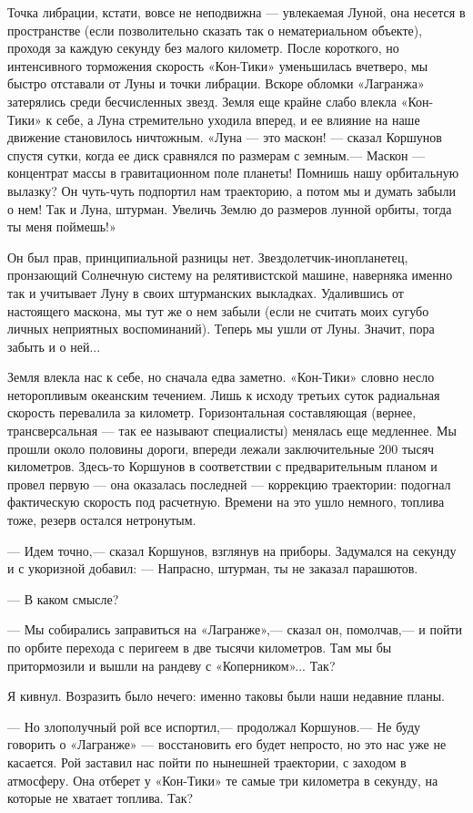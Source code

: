 \documentclass[11pt,a4paper,oneside]{article}
\begin{document}
Точка либрации, кстати, вовсе не неподвижна — увлекаемая Луной, она несется в пространстве (если позволительно сказать так о нематериальном объекте), проходя за каждую секунду без малого километр. После короткого, но интенсивного торможения скорость «Кон-Тики» уменьшилась вчетверо, мы быстро отставали от Луны и точки либрации. Вскоре обломки «Лагранжа» затерялись среди бесчисленных звезд. Земля еще крайне слабо влекла «Кон- Тики» к себе, а Луна стремительно уходила вперед, и ее влияние на наше движение становилось ничтожным. «Луна — это маскон! — сказал Коршунов спустя сутки, когда ее диск сравнялся по размерам с земным.— Маскон — концентрат массы в гравитационном поле планеты! Помнишь нашу орбитальную вылазку? Он чуть-чуть подпортил нам траекторию, а потом мы и думать забыли о нем! Так и Луна, штурман. Увеличь Землю до размеров лунной орбиты, тогда ты меня поймешь!»

Он был прав, принципиальной разницы нет. Звездолетчик-инопланетец, пронзающий Солнечную систему на релятивистской машине, наверняка именно так и учитывает Луну в своих штурманских выкладках. Удалившись от настоящего маскона, мы тут же о нем забыли (если не считать моих сугубо личных неприятных воспоминаний). Теперь мы ушли от Луны. Значит, пора забыть и о ней...

Земля влекла нас к себе, но сначала едва заметно. «Кон-Тики» словно несло неторопливым океанским течением. Лишь к исходу третьих суток радиальная скорость перевалила за километр. Горизонтальная составляющая (вернее, трансверсальная — так ее называют специалисты) менялась еще медленнее. Мы прошли около половины дороги, впереди лежали заключительные 200 тысяч километров. Здесь-то Коршунов в соответствии с предварительным планом и провел первую — она оказалась последней — коррекцию траектории: подогнал фактическую скорость под расчетную. Времени на это ушло немного, топлива тоже, резерв остался нетронутым.

— Идем точно,— сказал Коршунов, взглянув на приборы. Задумался на секунду и с укоризной добавил: — Напрасно, штурман, ты не заказал парашютов.

— В каком смысле?

— Мы собирались заправиться на «Лагранже»,— сказал он, помолчав,— и пойти по орбите перехода с перигеем в две тысячи километров. Там мы бы притормозили и вышли на рандеву с «Коперником»... Так?

Я кивнул. Возразить было нечего: именно таковы были наши недавние планы.

— Но злополучный рой все испортил,— продолжал Коршунов.— Не буду говорить о «Лагранже» — восстановить его будет непросто, но это нас уже не касается. Рой заставил нас пойти по нынешней траектории, с заходом в атмосферу. Она отберет у «Кон-Тики» те самые три километра в секунду, на которые не хватает топлива. Так?
\end{document}

